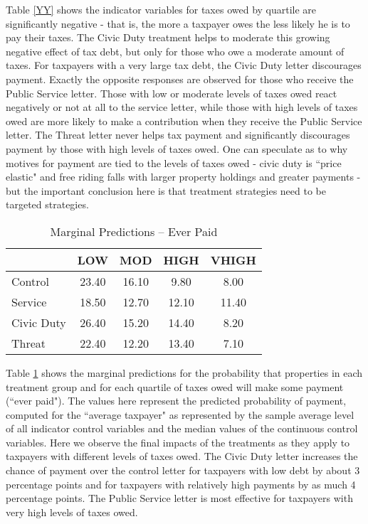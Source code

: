 \documentclass[12pt,titlepage]{article}
\begin{document}
Table \ref{YY} shows the indicator variables for taxes owed by quartile are significantly negative - that is, the more a taxpayer owes the less likely he is to pay their taxes.  The Civic Duty treatment helps to moderate this growing negative effect of tax debt, but only for those who owe a moderate amount of taxes.  For taxpayers with a very large tax debt, the Civic Duty letter discourages payment.  Exactly the opposite responses are observed for those who receive the Public Service letter.  Those with low or moderate levels of taxes owed react negatively or not at all to the service letter, while those with high levels of taxes owed are more likely to make a contribution when they receive the Public Service letter.  The Threat letter never helps tax payment and significantly discourages payment by those with high levels of taxes owed.  One can speculate as to why motives for payment are tied to the levels of taxes owed - civic duty is ``price elastic" and free riding falls with larger property holdings and greater payments - but the important conclusion here is that treatment strategies need to be targeted strategies.  

\begin{table}[htbp]
\caption{Marginal  Predictions -- Ever Paid}  \label{ZZ} 
\bigskip
\begin{center}
\begin{tabular}{| l | c | c | c | c |}
  \hline
 & LOW & MOD & HIGH & VHIGH \\ 
  \hline
Control & 23.40 & 16.10 & 9.80 & 8.00 \\ 
  Service & 18.50 & 12.70 & 12.10 & 11.40 \\ 
  Civic Duty & 26.40 & 15.20 & 14.40 & 8.20 \\ 
  Threat & 22.40 & 12.20 & 13.40 & 7.10 \\ 
   \hline
\end{tabular}
\end{center}
\end{table}


Table \ref{ZZ} shows the marginal predictions for the probability that properties in each treatment group and for each quartile of taxes owed will make some payment (``ever paid").  The values here represent the predicted probability of payment, computed for the ``average taxpayer" as represented by the sample average level of all indicator control variables and the median values of the continuous control variables.  Here we observe the final impacts of the treatments as they apply to taxpayers with different levels of taxes owed.   The Civic Duty letter increases the chance of payment over the control letter for taxpayers with low debt by about 3 percentage points and for taxpayers with relatively high payments by as much 4 percentage points.  The Public Service letter is most effective for taxpayers with very high levels of taxes owed.  
\end{document}
